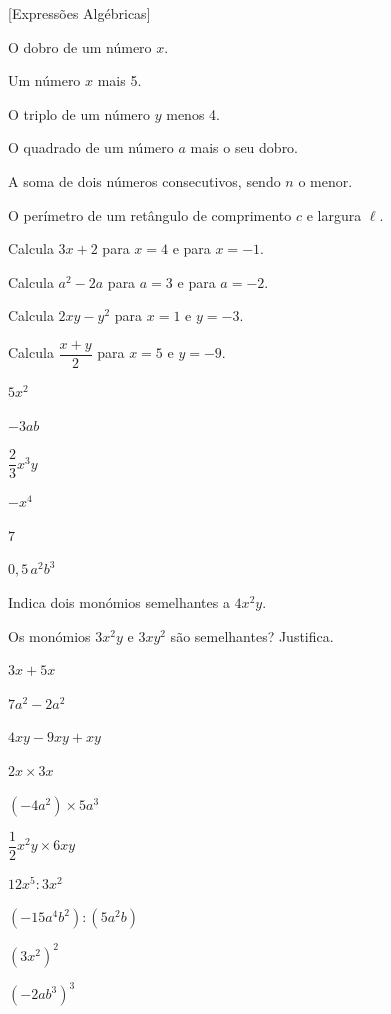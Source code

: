 \documentclass[12pt]{article}
\begin{document}
[Expressões Algébricas]


\begin{exercicios}
  \item O dobro de um número $x$.
  \item Um número $x$ mais 5.
  \item O triplo de um número $y$ menos 4.
  \item O quadrado de um número $a$ mais o seu dobro.
  \item A soma de dois números consecutivos, sendo $n$ o menor.
  \item O perímetro de um retângulo de comprimento $c$ e largura $\ell$.
  \item Calcula $3x + 2$ para $x = 4$ e para $x = -1$.
  \item Calcula $a^2 - 2a$ para $a = 3$ e para $a = -2$.
  \item Calcula $2xy - y^2$ para $x = 1$ e $y = -3$.
  \item Calcula $\dfrac{x + y}{2}$ para $x = 5$ e $y = -9$.
\end{exercicios}

\begin{exercicios}
  \item $5x^2$
  \item $-3ab$
  \item $\dfrac{2}{3}x^3y$
  \item $-x^4$
  \item $7$
  \item $0{,}5\,a^2b^3$
  \item Indica dois monómios semelhantes a $4x^2y$.
  \item Os monómios $3x^2y$ e $3xy^2$ são semelhantes? Justifica.
\end{exercicios}

\begin{exercicios}
  \item $3x + 5x$
  \item $7a^2 - 2a^2$
  \item $4xy - 9xy + xy$
  \item $2x \times 3x$
  \item $(-4a^2) \times 5a^3$
  \item $\dfrac{1}{2}x^2y \times 6xy$
  \item $12x^5 : 3x^2$
  \item $(-15a^4b^2) : (5a^2b)$
  \item $(3x^2)^2$
  \item $(-2ab^3)^3$
\end{exercicios}
\end{document}
